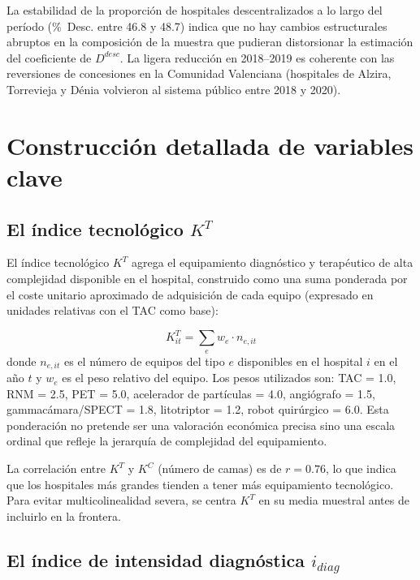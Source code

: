 La estabilidad de la proporción de hospitales descentralizados a lo largo del período (\%~Desc. entre 46.8 y 48.7) indica que no hay cambios estructurales abruptos en la composición de la muestra que pudieran distorsionar la estimación del coeficiente de $D^{desc}$. La ligera reducción en 2018--2019 es coherente con las reversiones de concesiones en la Comunidad Valenciana (hospitales de Alzira, Torrevieja y Dénia volvieron al sistema público entre 2018 y 2020).

\section{Construcción detallada de variables clave}
\label{sec:construccion_variables}

\subsection{El índice tecnológico \texorpdfstring{$K^T$}{K\^{}T}}

El índice tecnológico $K^T$ agrega el equipamiento diagnóstico y terapéutico de alta complejidad disponible en el hospital, construido como una suma ponderada por el coste unitario aproximado de adquisición de cada equipo (expresado en unidades relativas con el TAC como base):

\begin{equation}
  K^T_{it} = \sum_e w_e \cdot n_{e,it}
  \label{eq:kt}
\end{equation}
donde $n_{e,it}$ es el número de equipos del tipo $e$ disponibles en el hospital $i$ en el año $t$ y $w_e$ es el peso relativo del equipo. Los pesos utilizados son: TAC = 1.0, RNM = 2.5, PET = 5.0, acelerador de partículas = 4.0, angiógrafo = 1.5, gammacámara/SPECT = 1.8, litotriptor = 1.2, robot quirúrgico = 6.0. Esta ponderación no pretende ser una valoración económica precisa sino una escala ordinal que refleje la jerarquía de complejidad del equipamiento.

La correlación entre $K^T$ y $K^C$ (número de camas) es de $r = 0.76$, lo que indica que los hospitales más grandes tienden a tener más equipamiento tecnológico. Para evitar multicolinealidad severa, se centra $K^T$ en su media muestral antes de incluirlo en la frontera.

\subsection{El índice de intensidad diagnóstica \texorpdfstring{$i_{diag}$}{i\_diag}}

